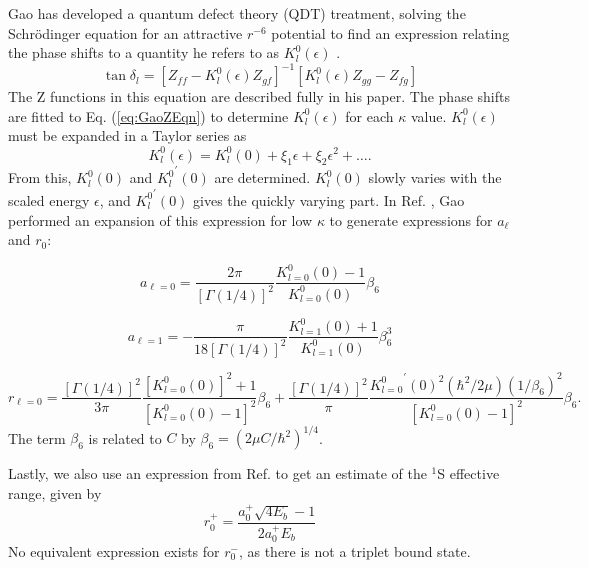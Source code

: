 \documentclass[preprint,showpacs,preprintnumbers,amsmath,amssymb]{revtex4}
\begin{document}
Gao has developed a quantum defect theory (QDT) treatment, solving the Schr\"{o}dinger equation for an attractive $r^{-6}$ potential to find an expression relating the phase shifts to a quantity he refers to as $K_l^0(\epsilon)$ \cite{Gao1998}.
\begin{equation}
\label{eq:GaoZEqn}
\tan\delta_l = [Z_{ff} - K_l^0(\epsilon) Z_{gf}]^{-1} [K_l^0(\epsilon) Z_{gg} - Z_{fg}]
\end{equation}
The Z functions in this equation are described fully in his paper. The phase shifts are fitted to Eq. (\ref{eq:GaoZEqn}) to determine $K_l^0(\epsilon)$ for each $\kappa$ value. $K_l^0(\epsilon)$ must be expanded in a Taylor series as
\begin{equation}
\label{eq:GaoKTaylor}
K_l^0(\epsilon) = K_l^0(0) + \xi_1 \epsilon + \xi_2 \epsilon^2 + \ldots.
\end{equation}
From this, $K_l^0(0)$ and ${K_l^0}^\prime(0)$ are determined. $K_l^0(0)$ slowly varies with the scaled energy $\epsilon$, and ${K_l^0}^\prime(0)$ gives the quickly varying part. In Ref. \cite{Gao1998a}, Gao performed an expansion of this expression for low $\kappa$ to generate expressions for $a_\ell$ and $r_0$:

\begin{equation}
\label{eq:GaoScatLenS}
a_{\ell=0} = \frac{2\pi}{[\Gamma(1/4)]^2} \frac{K_{l=0}^0(0) - 1}{K_{l=0}^0(0)} \beta_6
\end{equation}

\begin{equation}
\label{eq:GaoScatLenP}
a_{\ell=1} = -\frac{\pi}{18[\Gamma(1/4)]^2} \frac{K_{l=1}^0(0) + 1}{K_{l=1}^0(0)} \beta_6^3
\end{equation}

\begin{equation}
\label{eq:GaoEffRange}
r_{\ell=0} = \frac{[\Gamma(1/4)]^2}{3\pi} \frac{[K_{l=0}^0(0)]^2 + 1}{[K_{l=0}^0(0) - 1]^2} \beta_6 + \frac{[\Gamma(1/4)]^2}{\pi} \frac{{K_{l=0}^0}^\prime(0)^2(\hbar^2/2\mu)(1/\beta_6)^2}{[K_{l=0}^0(0) - 1]^2} \beta_6.
\end{equation}
The term $\beta_6$ is related to $C$ by $\beta_6 = (2\mu C/\hbar^2)^{1/4}$.

Lastly, we also use an expression from Ref. \cite{Blackwood2002} to get an estimate of the $^1$S effective range, given by
\begin{equation}
\label{eq:BlackwoodERT}
r_0^+ = \frac{a_0^+ \sqrt{4 E_b} - 1}{2 a_0^+ E_b}
\end{equation}
No equivalent expression exists for $r_0^-$, as there is not a triplet bound state.
\end{document}
